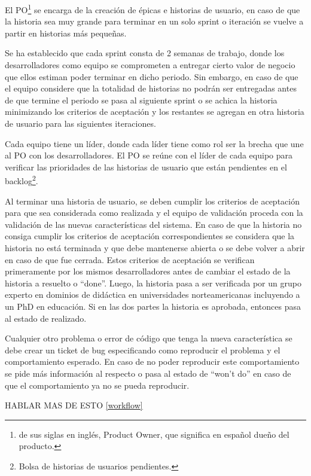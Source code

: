 El PO\footnote{de sus siglas en inglés, Product Owner, que significa en español dueño del producto.} se encarga de la creación de épicas e historias de usuario, en caso de que la historia sea muy grande para terminar en un solo sprint o iteración se vuelve a partir en historias más pequeñas. 

Se ha establecido que cada sprint consta de 2 semanas de trabajo, donde los desarrolladores como equipo se comprometen a entregar cierto valor de negocio que ellos estiman poder terminar en dicho periodo. Sin embargo, en caso de que el equipo considere que la totalidad de historias no podrán ser entregadas antes de que termine el periodo se pasa al siguiente sprint o se achica la historia minimizando los criterios de aceptación y los restantes se agregan en otra historia de usuario para las siguientes iteraciones.

Cada equipo tiene un líder, donde cada líder tiene como rol ser la brecha que une al PO con los desarrolladores. El PO se reúne con el líder de cada equipo para verificar las prioridades de las historias de usuario que están pendientes en el backlog\footnote{Bolsa de historias de usuarios pendientes.}. 

Al terminar una historia de usuario, se deben cumplir los criterios de aceptación para que sea considerada como realizada y el equipo de validación proceda con la validación de las nuevas características del sistema. En caso de que la historia no consiga cumplir los criterios de aceptación correspondientes se considera que la historia no está terminada y que debe mantenerse abierta o se debe volver a abrir en caso de que fue cerrada. Estos criterios de aceptación se verifican primeramente por los mismos desarrolladores antes de cambiar el estado de la historia a resuelto o “done”. Luego, la historia pasa a ser verificada por un grupo experto en dominios de didáctica en universidades norteamericanas incluyendo a un PhD en educación. Si en las dos partes la historia es aprobada, entonces pasa al estado de realizado. 

Cualquier otro problema o error de código que tenga la nueva característica se debe crear un ticket de bug especificando como reproducir el problema y el comportamiento esperado. En caso de no poder reproducir este comportamiento se pide más información al respecto o pasa al estado de “won’t do” en caso de que el comportamiento ya no se pueda reproducir.

HABLAR MAS DE ESTO \ref{workflow}

